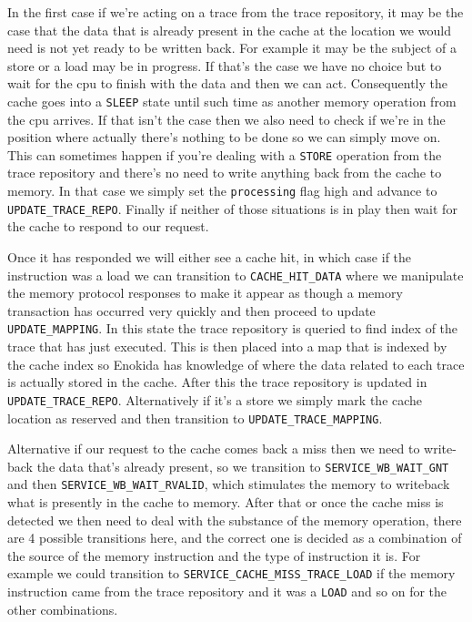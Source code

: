 In the first case if we're acting on a trace from the trace repository, it may be the case that the data that is already present in the cache at the location we would need is not yet ready to be written back. For example it may be the subject of a store or a load may be in progress. If that's the case we have no choice but to wait for the \gls{cpu} to finish with the data and then we can act. Consequently the cache goes into a \texttt{SLEEP} state until such time as another memory operation from the \gls{cpu} arrives. If that isn't the case then we also need to check if we're in the position where actually there's nothing to be done so we can simply move on. This can sometimes happen if you're dealing with a \texttt{STORE} operation from the trace repository and there's no need to write anything back from the cache to memory. In that case we simply set the \texttt{processing} flag high and advance to \texttt{UPDATE\_TRACE\_REPO}. Finally if neither of those situations is in play then wait for the cache to respond to our request.

Once it has responded we will either see a cache hit, in which case if the instruction was a load we can transition to \texttt{CACHE\_HIT\_DATA} where we manipulate the memory protocol responses to make it appear as though a memory transaction has occurred very quickly and then proceed to update \texttt{UPDATE\_MAPPING}. In this state the trace repository is queried to find index of the trace that has just executed. This is then placed into a map that is indexed by the cache index so Enokida has knowledge of where the data related to each trace is actually stored in the cache. After this the trace repository is updated in \texttt{UPDATE\_TRACE\_REPO}. Alternatively if it's a store we simply mark the cache location as reserved and then transition to \texttt{UPDATE\_TRACE\_MAPPING}. 

Alternative if our request to the cache comes back a miss then we need to write-back the data that's already present, so we transition to \texttt{SERVICE\_WB\_WAIT\_GNT} and then \texttt{SERVICE\_WB\_WAIT\_RVALID}, which stimulates the memory to writeback what is presently in the cache to memory. After that or once the cache miss is detected we then need to deal with the substance of the memory operation, there are 4 possible transitions here, and the correct one is decided as a combination of the source of the memory instruction and the type of instruction it is. For example we could transition to \texttt{SERVICE\_CACHE\_MISS\_TRACE\_LOAD} if the memory instruction came from the trace repository and it was a \texttt{LOAD} and so on for the other combinations.

